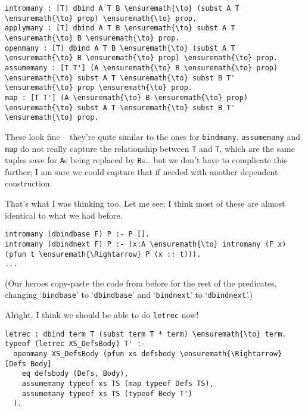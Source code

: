 \begin{verbatim}
intromany : [T] dbind A T B \ensuremath{\to} (subst A T \ensuremath{\to} prop) \ensuremath{\to} prop.
applymany : [T] dbind A T B \ensuremath{\to} subst A T \ensuremath{\to} B \ensuremath{\to} prop.
openmany : [T] dbind A T B \ensuremath{\to} (subst A T \ensuremath{\to} B \ensuremath{\to} prop) \ensuremath{\to} prop.
assumemany : [T T'] (A \ensuremath{\to} B \ensuremath{\to} prop) \ensuremath{\to} subst A T \ensuremath{\to} subst B T' \ensuremath{\to} prop \ensuremath{\to} prop.
map : [T T'] (A \ensuremath{\to} B \ensuremath{\to} prop) \ensuremath{\to} subst A T \ensuremath{\to} subst B T' \ensuremath{\to} prop.
\end{verbatim}

\heroADVISOR{} These look fine -- they're quite similar to the ones for
\texttt{bindmany}. \texttt{assumemany} and \texttt{map} do not really
capture the relationship between \texttt{T} and
\texttt{T\textquotesingle{}}, which are the same tuples save for
\texttt{A}s being replaced by \texttt{B}s\ldots{} but we don't have to
complicate this further; I am sure we could capture that if needed with
another dependent construction.

\heroSTUDENT{} That's what I was thinking too. Let me see; I think most of
these are almost identical to what we had before.

\begin{verbatim}
intromany (dbindbase F) P :- P [].
intromany (dbindnext F) P :- (x:A \ensuremath{\to} intromany (F x) (pfun t \ensuremath{\Rightarrow} P (x :: t))).
...
\end{verbatim}

\begin{scenecomment}
(Our heroes copy-paste the code from before for the rest of the predicates,
changing `\texttt{bindbase}' to `\texttt{dbindbase}' and `\texttt{bindnext}' to `\texttt{dbindnext}'.)
\end{scenecomment}

\heroADVISOR{} Alright, I think we should be able to do \texttt{letrec} now!

\begin{verbatim}
letrec : dbind term T (subst term T * term) \ensuremath{\to} term.
typeof (letrec XS_DefsBody) T' :-
  openmany XS_DefsBody (pfun xs defsbody \ensuremath{\Rightarrow} [Defs Body]
    eq defsbody (Defs, Body),
    assumemany typeof xs TS (map typeof Defs TS),
    assumemany typeof xs TS (typeof Body T')
  ).
\end{verbatim}

